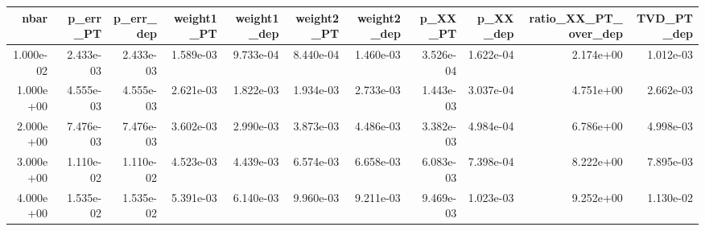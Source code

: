 \begin{tabular}{rrrrrrrrrrr}
\toprule
nbar & p_err_PT & p_err_dep & weight1_PT & weight1_dep & weight2_PT & weight2_dep & p_XX_PT & p_XX_dep & ratio_XX_PT_over_dep & TVD_PT_dep \\
\midrule
1.000e-02 & 2.433e-03 & 2.433e-03 & 1.589e-03 & 9.733e-04 & 8.440e-04 & 1.460e-03 & 3.526e-04 & 1.622e-04 & 2.174e+00 & 1.012e-03 \\
1.000e+00 & 4.555e-03 & 4.555e-03 & 2.621e-03 & 1.822e-03 & 1.934e-03 & 2.733e-03 & 1.443e-03 & 3.037e-04 & 4.751e+00 & 2.662e-03 \\
2.000e+00 & 7.476e-03 & 7.476e-03 & 3.602e-03 & 2.990e-03 & 3.873e-03 & 4.486e-03 & 3.382e-03 & 4.984e-04 & 6.786e+00 & 4.998e-03 \\
3.000e+00 & 1.110e-02 & 1.110e-02 & 4.523e-03 & 4.439e-03 & 6.574e-03 & 6.658e-03 & 6.083e-03 & 7.398e-04 & 8.222e+00 & 7.895e-03 \\
4.000e+00 & 1.535e-02 & 1.535e-02 & 5.391e-03 & 6.140e-03 & 9.960e-03 & 9.211e-03 & 9.469e-03 & 1.023e-03 & 9.252e+00 & 1.130e-02 \\
\bottomrule
\end{tabular}
